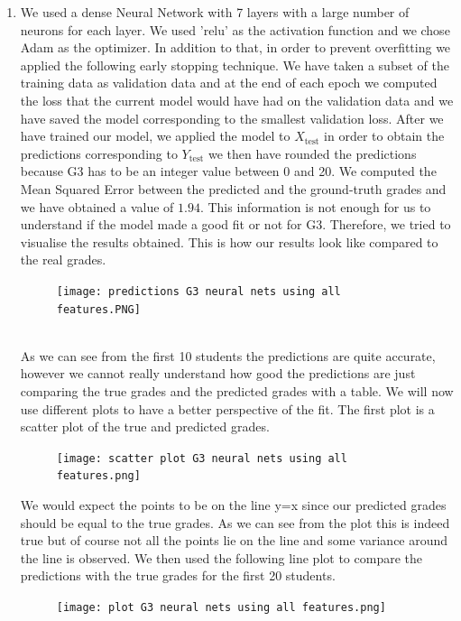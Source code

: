 \documentclass[a4paper, 11pt]{report}
\theoremstyle{definition}
\numberwithin{equation}{section}		%
\numberwithin{table}{section}				%
\begin{document}
\begin{enumerate}
    \item We used a dense Neural Network with 7 layers with a large number of neurons for each layer. We used 'relu' as the activation function and we chose Adam as the optimizer. In addition to that, in order to prevent overfitting we applied the following early stopping technique. We have taken a subset of the training data as validation data and at the end of each epoch we computed the loss that the current model would have had on the validation data and we have saved the model corresponding to the smallest validation loss. After we have trained our model, we applied the model to $X_{\text{test}}$ in order to obtain the predictions corresponding to $Y_{\text{test}}$ we then have rounded the predictions because G3 has to be an integer value between 0 and 20. We computed the Mean Squared Error between the predicted and the ground-truth grades and we have obtained a value of $1.94$. This information is not enough for us to understand if the model made a good fit or not for G3. Therefore, we tried to visualise the results obtained.
    This is how our results look like compared to the real grades.
    \begin{figure}[h]\centering
\texttt{[image: predictions G3 neural nets using all features.PNG]}
\end{figure}\\
As we can see from the first 10 students the predictions are quite accurate, however we cannot really understand how good the predictions are just comparing the true grades and the predicted grades with a table. We will now use different plots to have a better perspective of the fit. \newpage
The first plot is a scatter plot of the true and predicted grades.\\
\begin{figure}[H]
\centering
\texttt{[image: scatter plot G3 neural nets using all features.png]}
\end{figure}
We would expect the points to be on the line y=x since our predicted grades should be equal to the true grades. As we can see from the plot this is indeed true but of course not all the points lie on the line and some variance around the line is observed. We then used the following line plot to compare the predictions with the true grades for the first 20 students.\\
    \begin{figure}[h]\centering
\texttt{[image: plot G3 neural nets using all features.png]}
\end{figure}

\end{enumerate}
\end{document}
